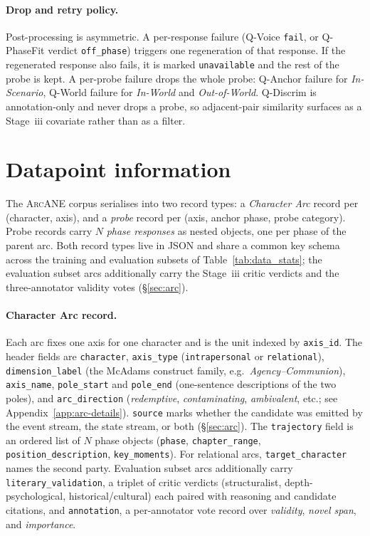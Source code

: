 \documentclass[11pt]{article}
\newcommand{\ours}{\textsc{ArcANE}}
\begin{document}
\paragraph{Drop and retry policy.}
Post-processing is asymmetric. A per-response failure (Q-Voice \texttt{fail}, or Q-PhaseFit verdict \texttt{off\_phase}) triggers one regeneration of that response. If the regenerated response also fails, it is marked \texttt{unavailable} and the rest of the probe is kept. A per-probe failure drops the whole probe: Q-Anchor failure for \emph{In-Scenario}, Q-World failure for \emph{In-World} and \emph{Out-of-World}. Q-Discrim is annotation-only and never drops a probe, so adjacent-pair similarity surfaces as a Stage~iii covariate rather than as a filter.

\section{Datapoint information\label{app:datapoint}}

The \ours{} corpus serialises into two record types: a \emph{Character Arc} record per (character, axis), and a \emph{probe} record per (axis, anchor phase, probe category). Probe records carry $N$ \emph{phase responses} as nested objects, one per phase of the parent arc. Both record types live in JSON and share a common key schema across the training and evaluation subsets of Table~\ref{tab:data_stats}; the evaluation subset arcs additionally carry the Stage~iii critic verdicts and the three-annotator validity votes (\S\ref{sec:arc}).

\paragraph{Character Arc record.}
Each arc fixes one axis for one character and is the unit indexed by \texttt{axis\_id}. The header fields are \texttt{character}, \texttt{axis\_type} (\texttt{intrapersonal} or \texttt{relational}), \texttt{dimension\_label} (the McAdams construct family, e.g.\ \emph{Agency--Communion}), \texttt{axis\_name}, \texttt{pole\_start} and \texttt{pole\_end} (one-sentence descriptions of the two poles), and \texttt{arc\_direction} (\emph{redemptive}, \emph{contaminating}, \emph{ambivalent}, etc.; see Appendix~\ref{app:arc-details}). \texttt{source} marks whether the candidate was emitted by the event stream, the state stream, or both (\S\ref{sec:arc}). The \texttt{trajectory} field is an ordered list of $N$ phase objects (\texttt{phase}, \texttt{chapter\_range}, \texttt{position\_description}, \texttt{key\_moments}). For relational arcs, \texttt{target\_character} names the second party. Evaluation subset arcs additionally carry \texttt{literary\_validation}, a triplet of critic verdicts (structuralist, depth-psychological, historical/cultural) each paired with reasoning and candidate citations, and \texttt{annotation}, a per-annotator vote record over \emph{validity}, \emph{novel span}, and \emph{importance}.
\end{document}
